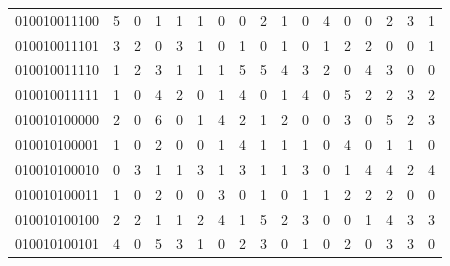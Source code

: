 \documentclass[10pt,a4paper]{article}
\begin{document}
\begin{longtable}{ |c|c|c|c|c|c|c|c|c|c|c|c|c|c|c|c|c| }
    010010011100              & 5                            & 0                                & 1                            & 1                              & 1   & 0   & 0   & 2   & 1   & 0   & 4   & 0   & 0   & 2   & 3   & 1   \\
    010010011101              & 3                            & 2                                & 0                            & 3                              & 1   & 0   & 1   & 0   & 1   & 0   & 1   & 2   & 2   & 0   & 0   & 1   \\
    010010011110              & 1                            & 2                                & 3                            & 1                              & 1   & 1   & 5   & 5   & 4   & 3   & 2   & 0   & 4   & 3   & 0   & 0   \\
    010010011111              & 1                            & 0                                & 4                            & 2                              & 0   & 1   & 4   & 0   & 1   & 4   & 0   & 5   & 2   & 2   & 3   & 2   \\
    010010100000              & 2                            & 0                                & 6                            & 0                              & 1   & 4   & 2   & 1   & 2   & 0   & 0   & 3   & 0   & 5   & 2   & 3   \\
    010010100001              & 1                            & 0                                & 2                            & 0                              & 0   & 1   & 4   & 1   & 1   & 1   & 0   & 4   & 0   & 1   & 1   & 0   \\
    010010100010              & 0                            & 3                                & 1                            & 1                              & 3   & 1   & 3   & 1   & 1   & 3   & 0   & 1   & 4   & 4   & 2   & 4   \\
    010010100011              & 1                            & 0                                & 2                            & 0                              & 0   & 3   & 0   & 1   & 0   & 1   & 1   & 2   & 2   & 2   & 0   & 0   \\
    010010100100              & 2                            & 2                                & 1                            & 1                              & 2   & 4   & 1   & 5   & 2   & 3   & 0   & 0   & 1   & 4   & 3   & 3   \\
    010010100101              & 4                            & 0                                & 5                            & 3                              & 1   & 0   & 2   & 3   & 0   & 1   & 0   & 2   & 0   & 3   & 3   & 0   \\

\end{longtable}
\end{document}
